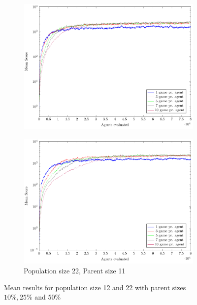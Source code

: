 \begin{figure}
\begin{subfigure}[b]{0.49\textwidth}
        \includegraphics[width=\textwidth]{data/ce_population_offspring/22x_split/constant_l22_o5/mean/PlotFile.pdf}
    \end{subfigure}
    \begin{subfigure}[b]{0.49\textwidth}
    	\caption{Population size 22, Parent size 11}
        \includegraphics[width=\textwidth]{data/ce_population_offspring/22x_split/constant_l22_o11/mean/PlotFile.pdf}
    \end{subfigure}
    
    \caption{Mean results for population size 12 and 22 with parent sizes $10 \% , 25 \%$ and $50 \%$}
\end{figure}

\clearpage

